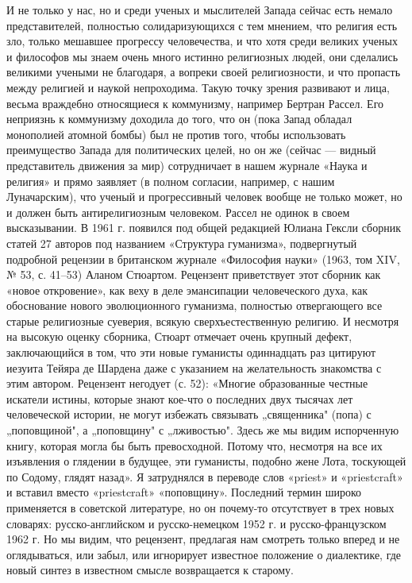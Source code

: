 И не только у  нас, но и среди ученых и  мыслителей Запада сейчас есть
немало представителей,  полностью солидаризующихся с тем  мнением, что
религия есть зло,  только мешавшее прогрессу человечества,  и что хотя
среди  великих  ученых  и  философов  мы  знаем  очень  много  истинно
религиозных  людей,  они  сделались  великими  учеными  не  благодаря,
а  вопреки  своей  религиозности,  и что  пропасть  между  религией  и
наукой  непроходима.  Такую  точку  зрения развивают  и  лица,  весьма
враждебно  относящиеся  к  коммунизму, например  Бертран  Рассел.  Его
неприязнь к  коммунизму доходила до  того, что он (пока  Запад обладал
монополией  атомной  бомбы) был  не  против  того, чтобы  использовать
преимущество  Запада для  политических  целей, но  он  же (сейчас  ---
видный  представитель движения  за мир)  сотрудничает в  нашем журнале
«Наука и  религия» и  прямо заявляет (в  полном согласии,  например, с
нашим  Луначарским),  что ученый  и  прогрессивный  человек вообще  не
только может,  но и должен  быть антирелигиозным человеком.  Рассел не
одинок в  своем высказывании. В  1961 г. появился под  общей редакцией
Юлиана  Гексли  сборник статей  27  авторов  под названием  «Структура
гуманизма»,  подвергнутый  подробной  рецензии  в  британском  журнале
«Философия науки»  (1963, том XIV,  № 53, с. 41--53)  Аланом Стюартом.
Рецензент  приветствует  этот  сборник  как  «новое  откровение»,  как
веху  в деле  эмансипации человеческого  духа, как  обоснование нового
эволюционного гуманизма, полностью отвергающего все старые религиозные
суеверия,  всякую сверхъестественную  религию. И  несмотря на  высокую
оценку сборника, Стюарт отмечает очень крупный дефект, заключающийся в
том, что эти  новые гуманисты одиннадцать раз  цитируют иезуита Тейяра
де  Шардена  даже  с  указанием на  желательность  знакомства  с  этим
автором.  Рецензент негодует  (с.  52):  «Многие образованные  честные
искатели истины,  которые знают кое-что  о последних двух  тысячах лет
человеческой истории, не могут  избежать связывать „священника" (попа)
с  „поповщиной",  а  „поповщину"  с „лживостью".  Здесь  же  мы  видим
испорченную  книгу, которая  могла бы  быть превосходной.  Потому что,
несмотря на  все их  изъявления о глядении  в будущее,  эти гуманисты,
подобно жене Лота, тоскующей по Содому, глядят назад». Я затруднялся в
переводе слов «priest» и  «priestcraft» и вставил вместо «priestcraft»
«поповщину».   Последний  термин   широко   применяется  в   советской
литературе,  но  он  почему-то  отсутствует  в  трех  новых  словарях:
русско-английском и русско-немецком 1952  г. и русско-французском 1962
г. Но мы видим, что рецензент,  предлагая нам смотреть только вперед и
не  оглядываться,  или забыл,  или  игнорирует  известное положение  о
диалектике,  где  новый  синтез  в  известном  смысле  возвращается  к
старому.

